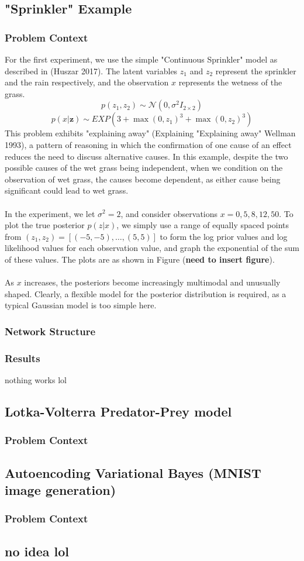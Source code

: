 \documentclass[a4paper,12pt]{article}
\newcommand{\N}{\mathcal{N}}
\numberwithin{equation}{section}
\begin{document}
\subsection{"Sprinkler" Example}
\subsubsection{Problem Context}
For the first experiment, we use the simple "Continuous Sprinkler" model as described in (Huszar 2017). The latent variables $z_1$ and $z_2$ represent the sprinkler and the rain respectively, and the observation $x$ represents the wetness of the grass.
\[p(z_1,z_2)\sim \N (0,\sigma^2 I_{2\times 2})\]
\[p(x|\bm{z})\sim EXP(3+\max(0,z_1)^3+\max(0,z_2)^3)\]
This problem exhibits "explaining away" (Explaining "Explaining away" Wellman 1993), a pattern of reasoning in which the confirmation of one cause of an effect reduces the need to discuss alternative causes. In this example, despite the two possible causes of the wet grass being independent, when we condition on the observation of wet grass, the causes become dependent, as either cause being significant could lead to wet grass.\\
\\
In the experiment, we let $\sigma^2=2$, and consider observations $x=0,5,8,12,50$. To plot the true posterior $p(z|x)$, we simply use a range of equally spaced points from $(z_1,z_2)=[(-5,-5),\dots, (5,5)]$ to form the log prior values and log likelihood values for each observation value, and graph the exponential of the sum of these values. The plots are as shown in Figure (\textbf{need to insert figure}).\\
\\
As $x$ increases, the posteriors become increasingly multimodal and unusually shaped. Clearly, a flexible model for the posterior distribution is required, as a typical Gaussian model is too simple here.
\subsubsection{Network Structure}

\subsubsection{Results}
nothing works lol
\subsection{Lotka-Volterra Predator-Prey model}
\subsubsection{Problem Context}

\subsection{Autoencoding Variational Bayes (MNIST image generation)}
\subsubsection{Problem Context}
\subsection{no idea lol}
\end{document}
